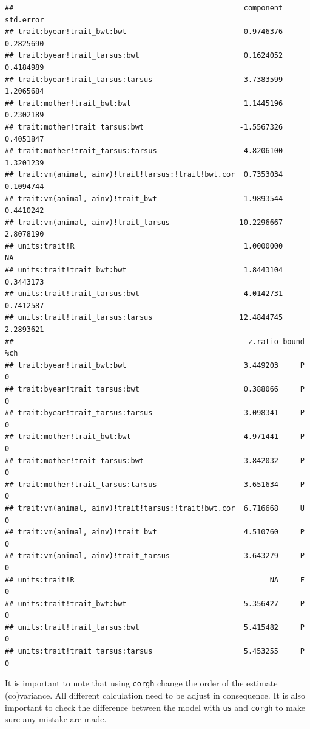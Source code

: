 \documentclass[
  12pt,
]{book}
\newenvironment{Shaded}{\begin{snugshade}}{\end{snugshade}}
\newcommand{\KeywordTok}[1]{\textcolor[rgb]{0.13,0.29,0.53}{\textbf{#1}}}
\newcommand{\NormalTok}[1]{#1}
\newcommand{\OperatorTok}[1]{\textcolor[rgb]{0.81,0.36,0.00}{\textbf{#1}}}
\begin{document}
\begin{verbatim}
##                                                     component std.error
## trait:byear!trait_bwt:bwt                           0.9746376 0.2825690
## trait:byear!trait_tarsus:bwt                        0.1624052 0.4184989
## trait:byear!trait_tarsus:tarsus                     3.7383599 1.2065684
## trait:mother!trait_bwt:bwt                          1.1445196 0.2302189
## trait:mother!trait_tarsus:bwt                      -1.5567326 0.4051847
## trait:mother!trait_tarsus:tarsus                    4.8206100 1.3201239
## trait:vm(animal, ainv)!trait!tarsus:!trait!bwt.cor  0.7353034 0.1094744
## trait:vm(animal, ainv)!trait_bwt                    1.9893544 0.4410242
## trait:vm(animal, ainv)!trait_tarsus                10.2296667 2.8078190
## units:trait!R                                       1.0000000        NA
## units:trait!trait_bwt:bwt                           1.8443104 0.3443173
## units:trait!trait_tarsus:bwt                        4.0142731 0.7412587
## units:trait!trait_tarsus:tarsus                    12.4844745 2.2893621
##                                                      z.ratio bound %ch
## trait:byear!trait_bwt:bwt                           3.449203     P   0
## trait:byear!trait_tarsus:bwt                        0.388066     P   0
## trait:byear!trait_tarsus:tarsus                     3.098341     P   0
## trait:mother!trait_bwt:bwt                          4.971441     P   0
## trait:mother!trait_tarsus:bwt                      -3.842032     P   0
## trait:mother!trait_tarsus:tarsus                    3.651634     P   0
## trait:vm(animal, ainv)!trait!tarsus:!trait!bwt.cor  6.716668     U   0
## trait:vm(animal, ainv)!trait_bwt                    4.510760     P   0
## trait:vm(animal, ainv)!trait_tarsus                 3.643279     P   0
## units:trait!R                                             NA     F   0
## units:trait!trait_bwt:bwt                           5.356427     P   0
## units:trait!trait_tarsus:bwt                        5.415482     P   0
## units:trait!trait_tarsus:tarsus                     5.453255     P   0
\end{verbatim}

It is important to note that using \texttt{corgh} change the order of the estimate (co)variance. All different calculation need to be adjust in consequence.
It is also important to check the difference between the model with \texttt{us} and \texttt{corgh} to make sure any mistake are made.

\begin{Shaded}
\end{Shaded}
\end{document}
